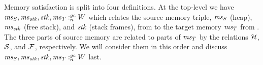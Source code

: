 \begin{jversion}
Memory satisfaction is split into four definitions.
At the top-level we have $\memSat{\ms_S,\ms_\stk,\stk,\ms_T}{W}$ which relates the source memory triple, $\ms_S$ (heap), $\ms_\stk$ (free stack), and $\stk$ (stack frames), from \srccm{} to the target memory $\ms_T$ from \trgcm{}.
The three parts of source memory are related to parts of $\ms_T$ by the relations $\lrhname$, $\lrstk[]$, and $\lrfree[]$, respectively. 
We will consider them in this order and discuss $\memSat{\ms_S,\ms_\stk,\stk,\ms_T}{W}$ last.


\end{jversion}
